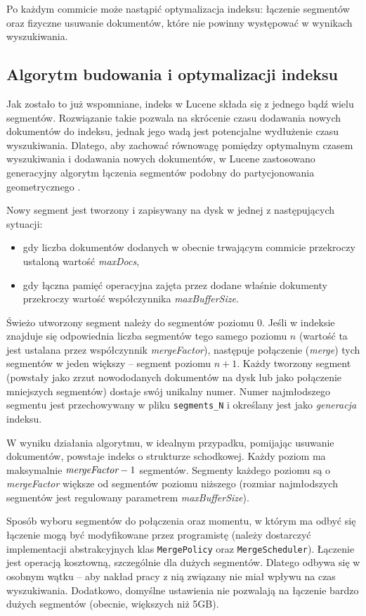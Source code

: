 Po każdym commicie może nastąpić optymalizacja indeksu: łączenie segmentów oraz fizyczne usuwanie dokumentów, które nie powinny występować w wynikach wyszukiwania.

\subsection{Algorytm budowania i optymalizacji indeksu}
\label{sec:segments}

Jak zostało to już wspomniane, indeks w Lucene składa się z jednego bądź wielu segmentów. Rozwiązanie takie pozwala na skrócenie czasu dodawania nowych dokumentów do indeksu, jednak jego wadą jest potencjalne wydłużenie czasu wyszukiwania. Dlatego, aby zachować równowagę pomiędzy optymalnym czasem wyszukiwania i dodawania nowych dokumentów, w Lucene zastosowano generacyjny algorytm łączenia segmentów podobny do partycjonowania geometrycznego \cite{geopart}. 

Nowy segment jest tworzony i zapisywany na dysk w jednej z następujących sytuacji:
\begin{itemize}
 \item gdy liczba dokumentów dodanych w obecnie trwającym commicie przekroczy ustaloną wartość \emph{maxDocs},
 \item gdy łączna pamięć operacyjna zajęta przez dodane właśnie dokumenty przekroczy wartość współczynnika \emph{maxBufferSize}.
\end{itemize}
Świeżo utworzony segment należy do segmentów poziomu 0. Jeśli w indeksie znajduje się odpowiednia liczba segmentów tego samego poziomu $n$ (wartość ta jest ustalana przez współczynnik \emph{mergeFactor}), następuje połączenie (\emph{merge}) tych segmentów w jeden większy -- segment poziomu $n+1$. Każdy tworzony segment (powstały jako zrzut nowododanych dokumentów na dysk lub jako połączenie mniejszych segmentów) dostaje swój unikalny numer. Numer najmłodszego segmentu jest przechowywany w pliku \texttt{segments\_N} i określany jest jako \emph{generacja} indeksu.

W wyniku działania algorytmu, w idealnym przypadku, pomijając usuwanie dokumentów, powstaje indeks o strukturze schodkowej. Każdy poziom ma maksymalnie $\emph{mergeFactor} - 1$ segmentów. Segmenty każdego poziomu są o \emph{mergeFactor} większe od segmentów poziomu niższego (rozmiar najmłodszych segmentów jest regulowany parametrem \emph{maxBufferSize}).

Sposób wyboru segmentów do połączenia oraz momentu, w którym ma odbyć się łączenie mogą być modyfikowane przez programistę (należy dostarczyć implementacji abstrakcyjnych klas \texttt{MergePolicy} oraz \texttt{MergeScheduler}). Łączenie jest operacją kosztowną, szczególnie dla dużych segmentów. Dlatego odbywa się w osobnym wątku -- aby nakład pracy z nią związany nie miał wpływu na czas wyszukiwania. Dodatkowo, domyślne ustawienia nie pozwalają na łączenie bardzo dużych segmentów (obecnie, większych niż 5GB).

